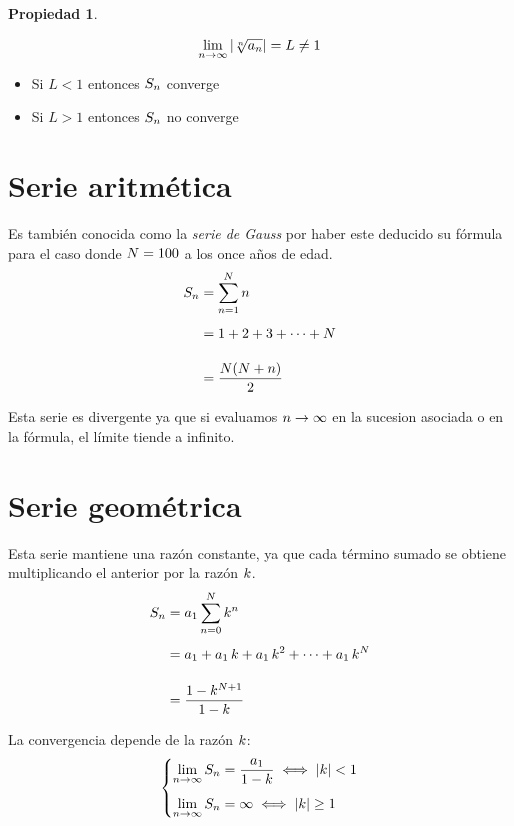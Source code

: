 \documentclass[a5paper,12pt,twoside]{book}
\newtheorem{prop}{{Propiedad}}[chapter]
\begin{document}
\begin{mdframed}[style=MyFrame1]
    \begin{prop}
        \label{prop:CauchyCriterion}
    \end{prop}
    \begin{equation*}
        \lim_{n\to\infty} {\left| {\sqrt[n]{a_n}} \right|} = L \neq 1
    \end{equation*}
    \begin{itemize}
        \item Si $L<1$ entonces $S_n$ converge
        \item Si $L>1$ entonces $S_n$ no converge
    \end{itemize}
\end{mdframed}


\section{Serie aritmética}

Es también conocida como la \emph{serie de Gauss} por haber este deducido su fórmula para el caso donde $N=100$ a los once años de edad.
\begin{align*}
    S_n &= \sum_{n=1}^N n
    \\[1ex]
    &= 1 + 2 + 3 + \dots + N
    \\[1em]
    &= \frac{N(N+n)}{2}
\end{align*}

Esta serie es divergente ya que si evaluamos $n\to\infty$ en la sucesion asociada o en la fórmula, el límite tiende a infinito.


\section{Serie geométrica}

Esta serie mantiene una razón constante, ya que cada término sumado se obtiene multiplicando el anterior por la razón $k$.
\begin{align*}
    S_n &= a_1 \sum_{n=0}^N k^n
    \\[1ex]
    &= a_1 + a_1 \, k + a_1 \, k^2 + \dots + a_1 \, k^N
    \\[1em]
    &= \frac{1-k^{N+1}}{1-k}
\end{align*}

La convergencia depende de la razón $k$:
\begin{equation*}
    \left\{
    \begin{aligned}
        \lim_{n\to\infty} S_n &= \frac{a_1}{1-k} \iff {\left| {k} \right|} < 1
        \\[1ex]
        \lim_{n\to\infty} S_n &= \infty \iff {\left| {k} \right|} \geq 1
    \end{aligned}
    \right.
\end{equation*}
\end{document}
